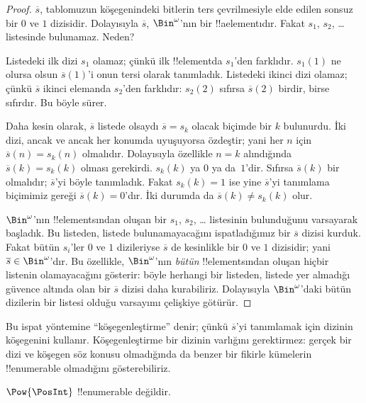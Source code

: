 \begin{proof}
$\overline{s}$, tablomuzun köşegenindeki bitlerin ters çevrilmesiyle elde
edilen sonsuz bir $0$ ve $1$ dizisidir. Dolayısıyla $\overline{s}$,
$\Bin^\omega$'nın bir !!a{element}{}ıdır. Fakat $s_1$,
$s_2$, \dots{} listesinde bulunamaz. Neden?

Listedeki ilk dizi $s_1$ olamaz; çünkü ilk !!{element}{}da $s_1$'den farklıdır.
$s_1(1)$ ne olursa olsun $\overline{s}(1)$'i onun tersi olarak tanımladık.
Listedeki ikinci dizi olamaz; çünkü $\overline{s}$ ikinci elemanda $s_2$'den
farklıdır: $s_2(2)$ sıfırsa $\overline{s}(2)$ birdir, birse sıfırdır. Bu
böyle sürer.

Daha kesin olarak, $\overline{s}$ listede olsaydı $\overline{s}=s_k$ olacak
biçimde bir $k$ bulunurdu. İki dizi, ancak ve ancak her konumda uyuşuyorsa
özdeştir; yani her $n$ için $\overline{s}(n)=s_k(n)$ olmalıdır. Dolayısıyla
özellikle $n=k$ alındığında $\overline{s}(k)=s_k(k)$ olması gerekirdi.
$s_k(k)$ ya $0$ ya da~$1$'dir. Sıfırsa $\overline{s}(k)$ bir olmalıdır;
$\overline{s}$'yi böyle tanımladık. Fakat $s_k(k)=1$ ise yine
$\overline{s}$'yi tanımlama biçimimiz gereği $\overline{s}(k)=0$'dır. İki
durumda da $\overline{s}(k)\neq s_k(k)$ olur.

$\Bin^\omega$'nın !!{element}s{}ından oluşan bir $s_1$, $s_2$, \dots{}
listesinin bulunduğunu varsayarak başladık. Bu listeden, listede
bulunamayacağını ispatladığımız bir $\overline{s}$ dizisi kurduk. Fakat bütün
$s_i$'ler $0$ ve $1$ dizileriyse $\overline{s}$ de kesinlikle bir $0$ ve
$1$ dizisidir; yani $\overline{s}\in\Bin^\omega$'dır. Bu özellikle,
$\Bin^\omega$'nın \emph{bütün} !!{element}s{}ından oluşan hiçbir listenin
olamayacağını gösterir: böyle herhangi bir listeden, listede yer almadığı
güvence altında olan bir $\overline{s}$ dizisi daha kurabiliriz. Dolayısıyla
$\Bin^\omega$'daki bütün dizilerin bir listesi olduğu varsayımı çelişkiye
götürür.
\end{proof}

\begin{explain}
Bu ispat yöntemine ``köşegenleştirme'' denir; çünkü $\overline{s}$'yi
tanımlamak için dizinin köşegenini kullanır. Köşegenleştirme bir dizinin
varlığını gerektirmez: gerçek bir dizi ve köşegen söz konusu olmadığında da
benzer bir fikirle kümelerin !!{enumerable} olmadığını gösterebiliriz.
\end{explain}

\begin{thm}
$\Pow{\PosInt}$ !!{enumerable} değildir.
\end{thm}


